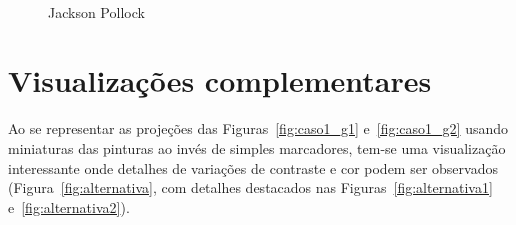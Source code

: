 \begin{figure}[htb]
  \hfill
   \\

  \caption{Jackson Pollock}
  \label{fig:pollock_1}
\end{figure}


\chapter{Visualizações complementares}


Ao se representar as projeções das Figuras~\ref{fig:caso1_g1}
e~\ref{fig:caso1_g2} usando miniaturas das pinturas ao invés de simples
marcadores, tem-se uma visualização interessante onde detalhes de variações de
contraste e cor podem ser observados (Figura~\ref{fig:alternativa}, com detalhes
destacados nas Figuras~\ref{fig:alternativa1} e~\ref{fig:alternativa2}).

